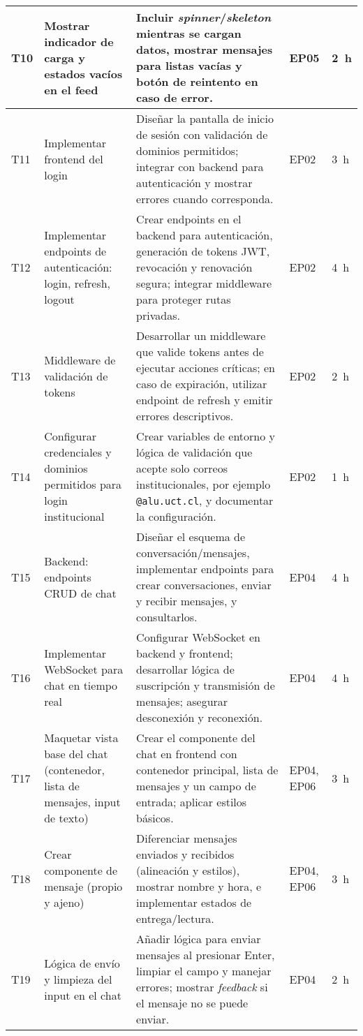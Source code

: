 \documentclass{article}
\begin{document}
\begin{longtable}{|p{}|p{}|p{}|p{}|p{}|}
\hline
T10 & Mostrar indicador de carga y estados vac\'ios en el feed & Incluir \emph{spinner}/\emph{skeleton} mientras se cargan datos, mostrar mensajes para listas vac\'ias y bot\'on de reintento en caso de error. & EP05 & 2~h \\
\hline
T11 & Implementar frontend del login & Dise\~nar la pantalla de inicio de sesi\'on con validaci\'on de dominios permitidos; integrar con backend para autenticaci\'on y mostrar errores cuando corresponda. & EP02 & 3~h \\
\hline
T12 & Implementar endpoints de autenticaci\'on: login, refresh, logout & Crear endpoints en el backend para autenticaci\'on, generaci\'on de tokens JWT, revocaci\'on y renovaci\'on segura; integrar middleware para proteger rutas privadas. & EP02 & 4~h \\
\hline
T13 & Middleware de validaci\'on de tokens & Desarrollar un middleware que valide tokens antes de ejecutar acciones cr\'iticas; en caso de expiraci\'on, utilizar endpoint de refresh y emitir errores descriptivos. & EP02 & 2~h \\
\hline
T14 & Configurar credenciales y dominios permitidos para login institucional & Crear variables de entorno y l\'ogica de validaci\'on que acepte solo correos institucionales, por ejemplo \texttt{@alu.uct.cl}, y documentar la configuraci\'on. & EP02 & 1~h \\
\hline
T15 & Backend: endpoints CRUD de chat & Dise\~nar el esquema de conversaci\'on/mensajes, implementar endpoints para crear conversaciones, enviar y recibir mensajes, y consultarlos. & EP04 & 4~h \\
\hline
T16 & Implementar WebSocket para chat en tiempo real & Configurar WebSocket en backend y frontend; desarrollar l\'ogica de suscripci\'on y transmisi\'on de mensajes; asegurar desconexi\'on y reconexi\'on. & EP04 & 4~h \\
\hline
T17 & Maquetar vista base del chat (contenedor, lista de mensajes, input de texto) & Crear el componente del chat en frontend con contenedor principal, lista de mensajes y un campo de entrada; aplicar estilos b\'asicos. & EP04, EP06 & 3~h \\
\hline
T18 & Crear componente de mensaje (propio y ajeno) & Diferenciar mensajes enviados y recibidos (alineaci\'on y estilos), mostrar nombre y hora, e implementar estados de entrega/lectura. & EP04, EP06 & 3~h \\
\hline
T19 & L\'ogica de env\'io y limpieza del input en el chat & A\~nadir l\'ogica para enviar mensajes al presionar Enter, limpiar el campo y manejar errores; mostrar \emph{feedback} si el mensaje no se puede enviar. & EP04 & 2~h \\

\end{longtable}
\end{document}
